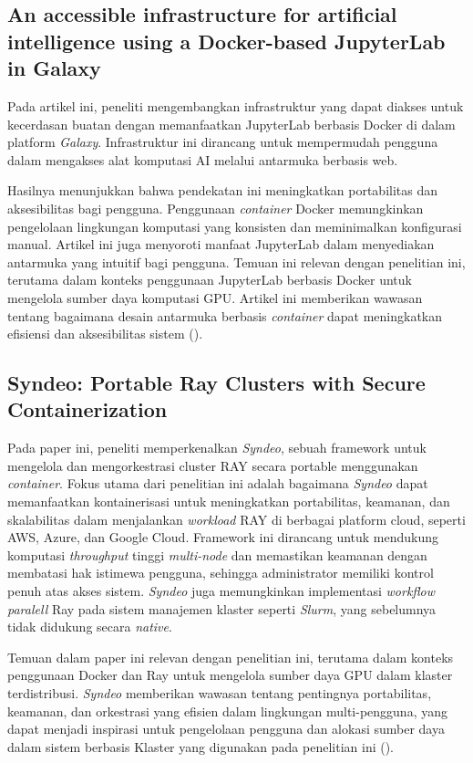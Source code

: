 \subsection{An accessible infrastructure for artificial intelligence using a Docker-based JupyterLab in Galaxy}

Pada artikel ini, peneliti mengembangkan infrastruktur yang dapat diakses untuk kecerdasan buatan dengan memanfaatkan JupyterLab berbasis Docker di dalam platform \textit{Galaxy}. Infrastruktur ini dirancang untuk mempermudah pengguna dalam mengakses alat komputasi AI melalui antarmuka berbasis web.

Hasilnya menunjukkan bahwa pendekatan ini meningkatkan portabilitas dan aksesibilitas bagi pengguna. Penggunaan \emph{container} Docker memungkinkan pengelolaan lingkungan komputasi yang konsisten dan meminimalkan konfigurasi manual. Artikel ini juga menyoroti manfaat JupyterLab dalam menyediakan antarmuka yang intuitif bagi pengguna. Temuan ini relevan dengan penelitian ini, terutama dalam konteks penggunaan JupyterLab berbasis Docker untuk mengelola sumber daya komputasi GPU. Artikel ini memberikan wawasan tentang bagaimana desain antarmuka berbasis \emph{container} dapat meningkatkan efisiensi dan aksesibilitas sistem (\cite{kumar2023accessible}).

\subsection{Syndeo: Portable Ray Clusters with Secure  Containerization}

Pada paper ini, peneliti memperkenalkan \textit{Syndeo}, sebuah framework untuk mengelola dan mengorkestrasi cluster RAY secara portable menggunakan \textit{container}. Fokus utama dari penelitian ini adalah bagaimana \textit{Syndeo} dapat memanfaatkan kontainerisasi untuk meningkatkan portabilitas, keamanan, dan skalabilitas dalam menjalankan \emph{workload} RAY di berbagai platform cloud, seperti AWS, Azure, dan Google Cloud. Framework ini dirancang untuk mendukung komputasi \emph{throughput} tinggi \emph{multi-node} dan memastikan keamanan dengan membatasi hak istimewa pengguna, sehingga administrator memiliki kontrol penuh atas akses sistem. \textit{Syndeo} juga memungkinkan implementasi\textit{ workflow paralell} Ray pada sistem manajemen klaster seperti \textit{Slurm}, yang sebelumnya tidak didukung secara \textit{native}.

Temuan dalam paper ini relevan dengan penelitian ini, terutama dalam konteks penggunaan Docker dan Ray untuk mengelola sumber daya GPU dalam klaster terdistribusi. \textit{Syndeo} memberikan wawasan tentang pentingnya portabilitas, keamanan, dan orkestrasi yang efisien dalam lingkungan multi-pengguna, yang dapat menjadi inspirasi untuk pengelolaan pengguna dan alokasi sumber daya dalam sistem berbasis Klaster yang digunakan pada penelitian ini (\cite{li2024syndeo}).

